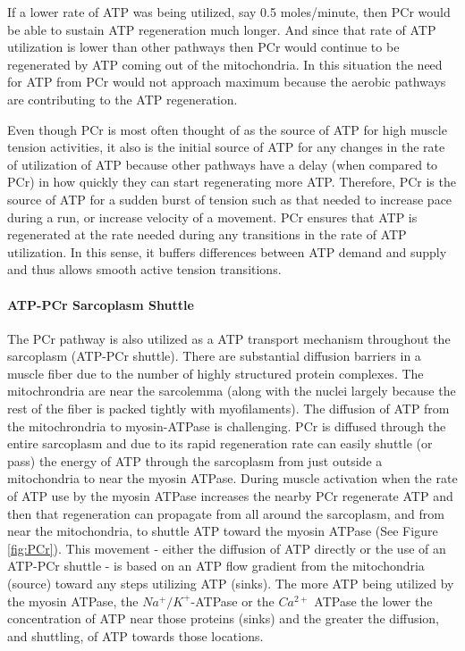 If a lower rate of ATP was being utilized, say 0.5 moles/minute, then PCr would be able to sustain ATP regeneration much longer. And since that rate of ATP utilization is lower than other pathways then PCr would continue to be regenerated by ATP coming out of the mitochondria. In this situation the need for ATP from PCr would not approach maximum because the aerobic pathways are contributing to the ATP regeneration.

Even though PCr is most often thought of as the source of ATP for high muscle tension activities, it also is the initial source of ATP for any changes in the rate of utilization of ATP because other pathways have a delay (when compared to PCr) in how quickly they can start regenerating more ATP. Therefore, PCr is the source of ATP for a sudden burst of tension such as that needed to increase pace during a run, or increase velocity of a movement. PCr ensures that ATP is regenerated at the rate needed during any transitions in the rate of ATP utilization. In this sense, it buffers differences between ATP demand and supply and thus allows smooth active tension transitions.

\paragraph{ATP-PCr Sarcoplasm Shuttle}
The PCr pathway is also utilized as a ATP transport mechanism throughout the sarcoplasm (ATP-PCr shuttle). There are substantial diffusion barriers in a muscle fiber due to the number of highly structured protein complexes. The mitochrondria are near the sarcolemma (along with the nuclei largely because the rest of the fiber is packed tightly with myofilaments). The diffusion of ATP from the mitochrondria to myosin-ATPase is challenging. PCr is diffused through the entire sarcoplasm and due to its rapid regeneration rate can easily shuttle (or pass) the energy of ATP through the sarcoplasm from just outside a mitochondria to near the myosin ATPase. During muscle activation when the rate of ATP use by the myosin ATPase increases the nearby PCr regenerate ATP and then that regeneration can propagate from all around the sarcoplasm, and from near the mitochondria, to shuttle ATP toward the myosin ATPase (See Figure \ref{fig:PCr}). This movement - either the diffusion of ATP directly or the use of an ATP-PCr shuttle - is based on an ATP flow gradient from the mitochondria (source) toward any steps utilizing ATP (sinks). The more ATP being utilized by the myosin ATPase, the $Na^+/K^+$-ATPase or the $Ca^{2+}$ ATPase the lower the concentration of ATP near those proteins (sinks) and the greater the diffusion, and shuttling, of ATP towards those locations.

